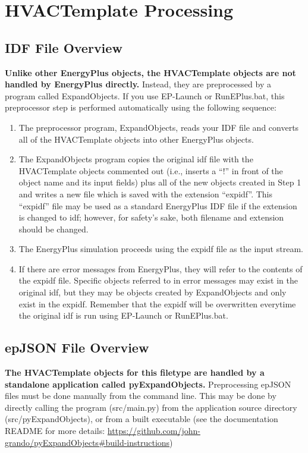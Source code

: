\section{HVACTemplate Processing}\label{hvactemplate-processing}

\subsection{IDF File Overview}

\textbf{Unlike other EnergyPlus objects, the HVACTemplate objects are not handled by EnergyPlus directly.} Instead, they are preprocessed by a program called ExpandObjects. If you use EP-Launch or RunEPlus.bat, this preprocessor step is performed automatically using the following sequence:

\begin{enumerate}
\def\labelenumi{\arabic{enumi})}
\item
  The preprocessor program, ExpandObjects, reads your IDF file and converts all of the HVACTemplate objects into other EnergyPlus objects.
\item
  The ExpandObjects program copies the original idf file with the HVACTemplate objects commented out (i.e., inserts a ``!'' in front of the object name and its input fields) plus all of the new objects created in Step 1 and writes a new file which is saved with the extension ``expidf''. This ``expidf'' file may be used as a standard EnergyPlus IDF file if the extension is changed to idf; however, for safety's sake, both filename and extension should be changed.
\item
  The EnergyPlus simulation proceeds using the expidf file as the input stream.
\item
  If there are error messages from EnergyPlus, they will refer to the contents of the expidf file. Specific objects referred to in error messages may exist in the original idf, but they may be objects created by ExpandObjects and only exist in the expidf. Remember that the expidf will be overwritten everytime the original idf is run using EP-Launch or RunEPlus.bat.
\end{enumerate}

\subsection{epJSON File Overview}
\textbf{The HVACTemplate objects for this filetype are handled by a standalone application called pyExpandObjects.}  Preprocessing epJSON files must be done manually from the command line.  This may be done by directly calling the program (src/main.py) from the application source directory (src/pyExpandObjects), or from a built executable (see the documentation README for more details: \url{https://github.com/john-grando/pyExpandObjects#build-instructions})

